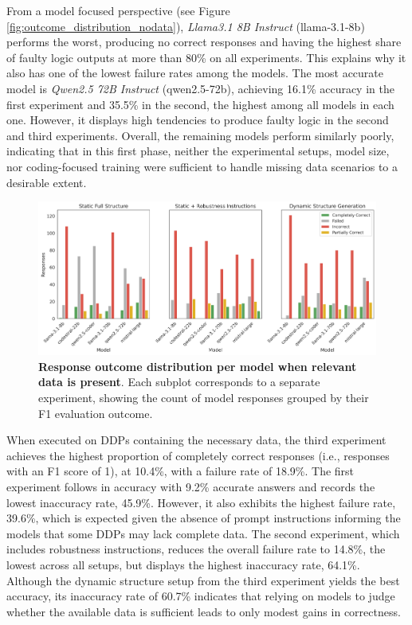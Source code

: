 \documentclass{DESSThesis}
\begin{document}
From a model focused perspective (see Figure \ref{fig:outcome_distribution_nodata}), \emph{Llama3.1 8B Instruct} (llama-3.1-8b) performs the worst, producing no correct responses and having the highest share of faulty logic outputs at more than 80\% on all experiments. This explains why it also has one of the lowest failure rates among the models. The most accurate model is \emph{Qwen2.5 72B Instruct} (qwen2.5-72b), achieving 16.1\% accuracy in the first experiment and 35.5\% in the second, the highest among all models in each one. However, it displays high tendencies to produce faulty logic in the second and third experiments. Overall, the remaining models perform similarly poorly, indicating that in this first phase, neither the experimental setups, model size, nor coding-focused training were sufficient to handle missing data scenarios to a desirable extent.

\begin{figure}[ht]
    \centering
    \includegraphics[width=\linewidth]{img/Results/First Experimental Phase/Response Outcome Distribution per Model - With Data.png}
    \caption[Response outcome distribution per model when relevant data is present]{\textbf{Response outcome distribution per model when relevant data is present}. Each subplot corresponds to a separate experiment, showing the count of model responses grouped by their F1 evaluation outcome.}
    \label{fig:outcome_distribution_data}
\end{figure}

When executed on DDPs containing the necessary data, the third experiment achieves the highest proportion of completely correct responses (i.e., responses with an F1 score of 1), at 10.4\%, with a failure rate of 18.9\%. The first experiment follows in accuracy with 9.2\% accurate answers and records the lowest inaccuracy rate, 45.9\%. However, it also exhibits the highest failure rate, 39.6\%, which is expected given the absence of prompt instructions informing the models that some DDPs may lack complete data. The second experiment, which includes robustness instructions, reduces the overall failure rate to 14.8\%, the lowest across all setups, but displays the highest inaccuracy rate, 64.1\%. Although the dynamic structure setup from the third experiment yields the best accuracy, its inaccuracy rate of 60.7\% indicates that relying on models to judge whether the available data is sufficient leads to only modest gains in correctness.
\end{document}
